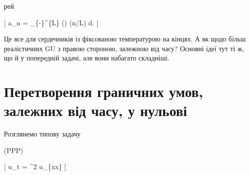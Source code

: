 \documentclass[
  ukrainian,
]{article}
\begin{document}
рей

{[} a\_n =  \int\_\{-\infty\}\^{}\{L\} \overline{\phi}(\xi)
\sin(\pi n\xi/L) d\xi. {]}

Це все для сердечників із фіксованою температурою на кінцях. А як щодо
більш реалістичних GU з правою стороною, залежною від часу? Основні ідеї
тут ті ж, що й у попередній задачі, але вони набагато складніші.

\section{Перетворення граничних умов, залежних від часу, у
нульові}\label{ux43fux435ux440ux435ux442ux432ux43eux440ux435ux43dux43dux44f-ux433ux440ux430ux43dux438ux447ux43dux438ux445-ux443ux43cux43eux432-ux437ux430ux43bux435ux436ux43dux438ux445-ux432ux456ux434-ux447ux430ux441ux443-ux443-ux43dux443ux43bux44cux43eux432ux456}

Розглянемо типову задачу

(PPP)

{[} u\_t = \alpha\^{}2 u\_\{xx\} {]}
\end{document}
